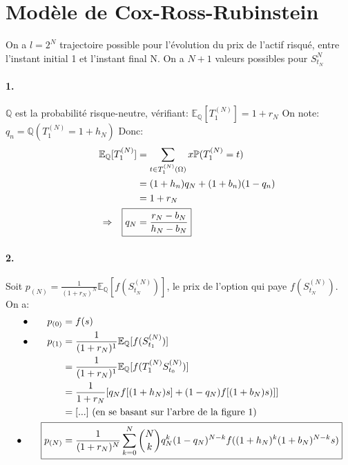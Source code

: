 \documentclass[10pt]{article}
\begin{document}
  \section{Modèle de Cox-Ross-Rubinstein}
  On a \( \boxed{l = 2^N} \) trajectoire possible pour l'évolution du prix de l'actif risqué, entre l'instant initial 1 et l'instant final N.
  \newline
  On a \( \boxed{N + 1}   \) valeurs possibles pour \( S^{N}_{t_N} \)\newline
  \newline
  \paragraph{1.} \(\mathbb{Q}\) est la probabilité risque-neutre, vérifiant: \( \mathbb{E}_{\mathbb{Q}}[T^{(N)}_{1}] = 1 + r_N \)
  \newline
  On note: \( q_n = \mathbb{Q}(T^{(N)}_1 = 1 + h_N) \)
  Donc:
  \begin{equation}
    \begin{split}
      \mathbb{E}_{\mathbb{Q}}[T^{(N)}_1] &= \sum_{t \in T^{(N)}_{1}(\Omega)}x 	\mathbb{P}(T^{(N)}_{1} = t) \\
      \qquad &= (1 + h_n) q_N + (1 + b_n) (1 - q_n) \\
      \qquad &= 1 + r_N \\					
      \qquad \Rightarrow \quad \Aboxed{q_N &= \frac{r_N - b_N}{h_N - b_N}}
    \end{split}
  \end{equation}
  
  \paragraph{2.} Soit \(   p_(N) = \frac{1}{(1 + r_N)^N} \mathbb{E}_{\mathbb{Q}}[f(S^{(N)}_{t_N})]   \),
  le prix de l'option qui paye \( f(S^{(N)}_{t_N}) \).
  \newline
  On a:
  \begin{equation}
    \begin{split}
      \bullet \qquad p_{(0)} 	&= f(s) \\
      \bullet \qquad p_{(1)} 	&= \frac{1}{(1 + r_N)^1} \mathbb{E}_{\mathbb{Q}}[f(S^{(N)}_{t_1})] \\
      &= \frac{1}{(1 + r_N)^1} \mathbb{E}_{\mathbb{Q}}[f(T^{(N)}_{1} S^{(N)}_{t_0})] \\
      &= \frac{1}{1 + r_N} [ q_N f[(1 + h_N)  s] + (1 - q_N) f[(1 + b_N)  s)] ] \\
      &= [...] \text{ (en se basant sur l'arbre de la figure 1)}\\
      \bullet \qquad  \Aboxed{ p_{(N)} 	&= \frac{1}{(1 + r_N)^N} \sum^{N}_{k = 0} {N\choose k} q_N^k (1 - q_N)^{N - k} f((1 + h_N)^k (1 + b_N)^{N - k} s)}
    \end{split}
  \end{equation}
  
\end{document}
